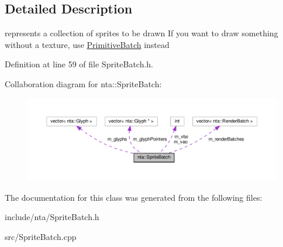 \subsection{Detailed Description}
represents a collection of sprites to be drawn If you want to draw something without a texture, use \hyperlink{classnta_1_1PrimitiveBatch}{Primitive\+Batch} instead 

Definition at line 59 of file Sprite\+Batch.\+h.



Collaboration diagram for nta\+:\+:Sprite\+Batch\+:\nopagebreak
\begin{figure}[H]
\begin{center}
\leavevmode
\includegraphics[width=350pt]{da/dc5/classnta_1_1SpriteBatch__coll__graph}
\end{center}
\end{figure}


The documentation for this class was generated from the following files\+:\begin{DoxyCompactItemize}
\item 
include/nta/Sprite\+Batch.\+h\item 
src/Sprite\+Batch.\+cpp\end{DoxyCompactItemize}
